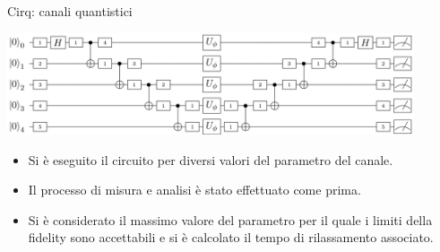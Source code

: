 \documentclass{beamer}
\renewcommand{\'}[0]{\`}
\begin{document}
	\begin{frame}{Cirq: canali quantistici}
	
	\centering \includegraphics[width=0.9\textwidth]{./image/NoiseCircuit.png} 	
	\vspace{0.1cm} \pause
	
	\begin{itemize}
	\item Si è eseguito il circuito per \alert{diversi} valori del parametro del canale. \pause
	\item Il processo di misura e analisi è stato effettuato come prima.  \pause
	\item Si è considerato il \alert{massimo} valore del parametro per il quale i limiti della fidelity sono accettabili e si è calcolato il \alert{tempo di rilassamento} associato.
	
\vspace{-0.3cm}



 	\end{itemize}
	
	\end{frame}
		
\end{document}
